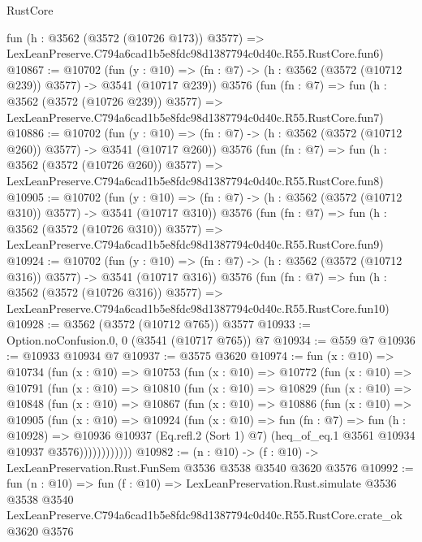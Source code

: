 \begin{lexlean}{RustCore}
\begin{coremodule}
    fun (h : @3562 (@3572 (@10726 @173)) @3577) =>
    LexLeanPreserve.C794a6cad1b5e8fdc98d1387794c0d40c.R55.RustCore.fun6)
@10867 := @10702
    (fun (y : @10) => (fn : @7) -> (h : @3562 (@3572 (@10712 @239)) @3577) -> @3541 (@10717 @239))
    @3576
    (fun (fn : @7) =>
    fun (h : @3562 (@3572 (@10726 @239)) @3577) =>
    LexLeanPreserve.C794a6cad1b5e8fdc98d1387794c0d40c.R55.RustCore.fun7)
@10886 := @10702
    (fun (y : @10) => (fn : @7) -> (h : @3562 (@3572 (@10712 @260)) @3577) -> @3541 (@10717 @260))
    @3576
    (fun (fn : @7) =>
    fun (h : @3562 (@3572 (@10726 @260)) @3577) =>
    LexLeanPreserve.C794a6cad1b5e8fdc98d1387794c0d40c.R55.RustCore.fun8)
@10905 := @10702
    (fun (y : @10) => (fn : @7) -> (h : @3562 (@3572 (@10712 @310)) @3577) -> @3541 (@10717 @310))
    @3576
    (fun (fn : @7) =>
    fun (h : @3562 (@3572 (@10726 @310)) @3577) =>
    LexLeanPreserve.C794a6cad1b5e8fdc98d1387794c0d40c.R55.RustCore.fun9)
@10924 := @10702
    (fun (y : @10) => (fn : @7) -> (h : @3562 (@3572 (@10712 @316)) @3577) -> @3541 (@10717 @316))
    @3576
    (fun (fn : @7) =>
    fun (h : @3562 (@3572 (@10726 @316)) @3577) =>
    LexLeanPreserve.C794a6cad1b5e8fdc98d1387794c0d40c.R55.RustCore.fun10)
@10928 := @3562 (@3572 (@10712 @765)) @3577
@10933 := Option.noConfusion.{0, 0} (@3541 (@10717 @765)) @7
@10934 := @559 @7
@10936 := @10933 @10934 @7
@10937 := @3575 @3620
@10974 := fun (x : @10) =>
  @10734
    (fun (x : @10) =>
    @10753
      (fun (x : @10) =>
      @10772
        (fun (x : @10) =>
        @10791
          (fun (x : @10) =>
          @10810
            (fun (x : @10) =>
            @10829
              (fun (x : @10) =>
              @10848
                (fun (x : @10) =>
                @10867
                  (fun (x : @10) =>
                  @10886
                    (fun (x : @10) =>
                    @10905
                      (fun (x : @10) =>
                      @10924
                        (fun (x : @10) =>
                        fun (fn : @7) =>
                        fun (h : @10928) =>
                        @10936
                          @10937
                          (Eq.refl.{2} (Sort 1) @7)
                          (heq_of_eq.{1} @3561 @10934 @10937 @3576))))))))))))
@10982 := (n : @10) -> (f : @10) -> LexLeanPreservation.Rust.FunSem @3536 @3538 @3540 @3620 @3576
@10992 := fun (n : @10) =>
  fun (f : @10) =>
  LexLeanPreservation.Rust.simulate
    @3536
    @3538
    @3540
    LexLeanPreserve.C794a6cad1b5e8fdc98d1387794c0d40c.R55.RustCore.crate_ok
    @3620
    @3576
\end{coremodule}
\end{lexlean}
